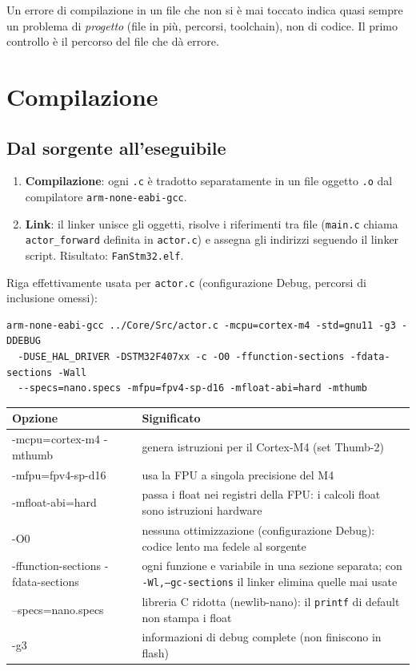 \documentclass[11pt,a4paper]{article}
\newcommand{\code}[1]{\texttt{\small #1}}
\begin{document}
\begin{nota}[Lezione]
Un errore di compilazione in un file che non si è mai toccato indica quasi sempre un problema di
\emph{progetto} (file in più, percorsi, toolchain), non di codice. Il primo controllo è il percorso
del file che dà errore.
\end{nota}

\section{Compilazione}

\subsection{Dal sorgente all'eseguibile}
\begin{enumerate}
\item \textbf{Compilazione}: ogni \code{.c} è tradotto separatamente in un file oggetto \code{.o}
  dal compilatore \code{arm-none-eabi-gcc}.
\item \textbf{Link}: il linker unisce gli oggetti, risolve i riferimenti tra file (\code{main.c}
  chiama \code{actor\_forward} definita in \code{actor.c}) e assegna gli indirizzi seguendo il
  linker script. Risultato: \code{FanStm32.elf}.
\end{enumerate}
Riga effettivamente usata per \code{actor.c} (configurazione Debug, percorsi di inclusione omessi):
\begin{lstlisting}[style=sh]
arm-none-eabi-gcc ../Core/Src/actor.c -mcpu=cortex-m4 -std=gnu11 -g3 -DDEBUG
  -DUSE_HAL_DRIVER -DSTM32F407xx -c -O0 -ffunction-sections -fdata-sections -Wall
  --specs=nano.specs -mfpu=fpv4-sp-d16 -mfloat-abi=hard -mthumb
\end{lstlisting}
\begin{center}
\small
\begin{tabularx}{\textwidth}{@{}>{\ttfamily}lX@{}}
\toprule
\normalfont\bfseries Opzione & \bfseries Significato\\
\midrule
-mcpu=cortex-m4 -mthumb & genera istruzioni per il Cortex-M4 (set Thumb-2)\\
-mfpu=fpv4-sp-d16 & usa la FPU a singola precisione del M4\\
-mfloat-abi=hard & passa i float nei registri della FPU: i calcoli float sono istruzioni hardware\\
-O0 & nessuna ottimizzazione (configurazione Debug): codice lento ma fedele al sorgente\\
-ffunction-sections -fdata-sections & ogni funzione e variabile in una sezione separata; con \code{-Wl,--gc-sections} il linker elimina quelle mai usate\\
--specs=nano.specs & libreria C ridotta (newlib-nano): il \code{printf} di default non stampa i float\\
-g3 & informazioni di debug complete (non finiscono in flash)\\
\bottomrule
\end{tabularx}
\end{center}
\end{document}
